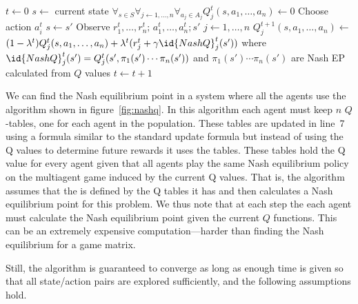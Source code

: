 \begin{SCfigure}
  \begin{minipage}{1.0\linewidth}
  \begin{codebox}
    \li $t \gets 0$
    \li $s \gets$ current state
    \li $\forall_{s \in S} \forall_{j \gets 1,\ldots,n} \forall_{a_j \in
      A_j} Q_j^t(s,a_1,\ldots,a_n) \gets 0$
    \li Choose action $a_i^t$
    \li $s \gets s'$
    \li Observe $r_1^t,\ldots,r_n^t;\, a_1^t,\ldots,a_n^t;s'$
    \li \For $j \gets 1,\ldots,n$ 
    \li \Do $Q_j^{t+1} (s, a_1,\ldots,a_n) \gets$
    \zi \>$(1 - \lambda^t) Q_j^{t}
    (s, a_1,\ldots,a_n) + \lambda^t(r_j^t + \gamma \id{NashQ}_j^t(s'))$
    \zi where $\id{NashQ}_j^t(s') =  Q_j^t(s', \pi_1(s')\cdots\pi_n(s'))$
    \zi and $\pi_1(s')\cdots\pi_n(s')$ are Nash EP calculated from $Q$ values
    \End
    \li $t \gets t + 1$
    \li {}
  \end{codebox}
  \end{minipage}
  \caption{ algorithm}
  \label{fig:nashq}
\end{SCfigure}

We can find the Nash equilibrium point in a system where all the
agents use the  algorithm shown in
figure~\ref{fig:nashq}. In this algorithm each agent must keep $n$
$Q$-tables, one for each agent in the population. These tables are
updated in line~7 using a formula similar to the standard
 update formula but instead of using the Q values to
determine future rewards it uses the  tables. These tables
hold the Q value for every agent given that all agents play the same
Nash equilibrium policy on the multiagent  game induced by
the current Q values. That is, the algorithm assumes that the
 is defined by the Q tables it has and then calculates a
Nash equilibrium point for this problem. We thus note that at each
step the each agent must calculate the Nash equilibrium point given
the current $Q$ functions.  This can be an extremely expensive
computation---harder than finding the Nash equilibrium for a game
matrix.

Still, the  algorithm is guaranteed to converge
as long as enough time is given so that all state/action pairs are
explored sufficiently, and the following assumptions hold.


